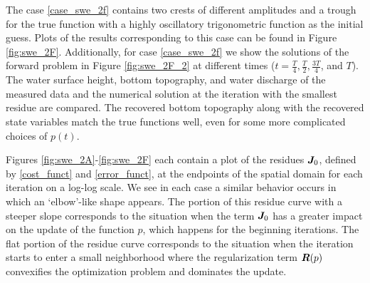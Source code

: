 The case \eqref{case_swe_2f} contains two crests of different amplitudes and a trough for the true function with a highly oscillatory trigonometric function as the initial guess. Plots of the results corresponding to this case can be found in Figure \ref{fig:swe_2F}. Additionally, for case \eqref{case_swe_2f} we show the solutions of the forward problem in Figure \ref{fig:swe_2F_2} at different times ($t=\frac{T}{4}, \frac{T}{2}, \frac{3T}{4}$, and $T$). The water surface height, bottom topography, and water discharge of the measured data and the numerical solution at the iteration with the smallest residue are compared. The recovered bottom topography along with the recovered state variables match the true functions well, even for some more complicated choices of $p(t)$.


Figures \ref{fig:swe_2A}-\ref{fig:swe_2F} each contain a plot of the residues $\bm{J}_0$, defined by \eqref{cost_funct} and \eqref{error_funct}, at the endpoints of the spatial domain for each iteration on a log-log scale. We see in each case a similar behavior occurs in which an `elbow'-like shape appears. The portion of this residue curve with a steeper slope corresponds to the situation when the term $\bm{J}_0$ has a greater impact on the update of the function $p$, which happens for the beginning iterations. The flat portion of the residue curve corresponds to the situation when the iteration starts to enter a small neighborhood where the regularization term $\bm{R}(p)$ convexifies the optimization problem and dominates the update. 

